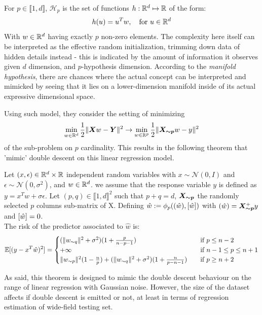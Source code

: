 \documentclass[10pt,oneside,oldfontcommands,dvipsnames,article]{memoir}
\begin{document}
\begin{definition}
For $p \in \llbracket1,d\rrbracket$, $\mathcal{H}_p$ is the set of functions $h:\mathbb{R}^d\mapsto \mathbb{R}$ of the form:
$$
h(u)=u^Tw,\quad \text{for }u \in \mathbb{R}^d
$$
With $w \in \mathbb{R}^d$ having exactly $p$ non-zero elements. The complexity here itself can be interpreted as the effective random initialization, trimming down data of hidden details instead - this is indicated by the amount of information it observes given $d$ dimension, and $p$-hypothesis dimension. According to the \textit{manifold hypothesis}, there are chances where the actual concept can be interpreted and mimicked by seeing that it lies on a lower-dimension manifold inside of its actual expressive dimensional space. 
\end{definition}
Using such model, they consider the setting of minimizing
\begin{equation}
\label{eq:linear_gaussian_erm}
\min_{w\in \mathbb{R}^d} \frac{1}{2}\lVert \bm{X} w - \bm{Y} \rVert^2 \to \min_{w\in \mathbb{R}^p} \frac{1}{2}\lVert \bm{X_{\sim p}} w - y \rVert^2
\end{equation}
of the sub-problem on $p$ cardinality. This results in the following theorem that 'mimic' double descent on this linear regression model. 
\begin{theorem}
\label{thm:double_descent_lr}
Let $(x, \epsilon)\in \mathbb{R}^d\times\mathbb{R}$ independent random variables with $x \sim \mathcal{N}(0,I)$  and $\epsilon \sim \mathcal{N}(0,\sigma^2)$, and $w \in \mathbb{R}^d$. we assume that the response variable $y$ is defined as $y=x^Tw +\sigma \epsilon$. Let $(p,q) \in \llbracket 1, d\rrbracket^2$ such that $p+q=d$, $\bm{X_{\sim p}}$ the randomly selected $p$ columns sub-matrix of X. Defining $\hat w:=\phi_p(({\hat w}),[{\hat w}])$ with $({\hat w})=\bm{X_{\sim p}}^+y$ and $[{\hat w}] = 0$.\\
The risk of the predictor associated to $\hat w$ is:
$$
\mathbb{E}[(y-x^T\hat w)^2] = 
\begin{cases}
(\lVert w_{\sim q} \rVert^2+\sigma^2)(1+\frac{p}{n-p-1}) &\quad\text{if } p\leq  n-2\\
+\infty &\quad\text{if }n-1 \leq p\leq  n+1\\
\lVert w_{\sim p} \rVert^2(1-\frac{n}{p}) +  (\lVert w_{\sim q} \rVert^2+\sigma^2)(1+\frac{n}{p-n-1}) &\quad\text{if }p\geq n+2\end{cases}
$$
\end{theorem}
As said, this theorem is designed to mimic the double descent behaviour on the range of linear regression with Gaussian noise. However, the size of the dataset affects if double descent is emitted or not, at least in terms of regression estimation of wide-field testing set. 
\end{document}
